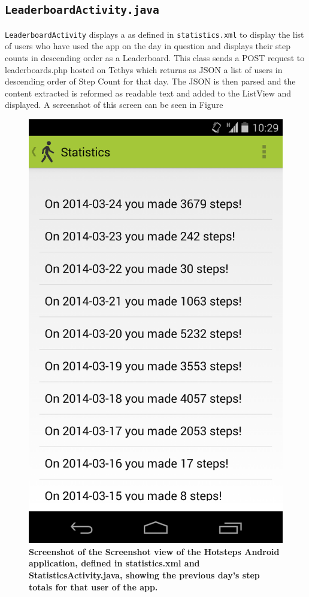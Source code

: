 \documentclass{l4proj}
\begin{document}
\subsection{\texttt{LeaderboardActivity.java}}

\texttt{LeaderboardActivity} displays a \texttt{} as defined in \texttt{statistics.xml} to display the list of users who have used the app on the day in question and displays their step counts in descending order as a Leaderboard. This class sends a POST request to leaderboards.php hosted on Tethys which returns as JSON a list of users in descending order of Step Count for that day. The JSON is then parsed and the content extracted is reformed as readable text and added to the ListView and displayed. A screenshot of this screen can be seen in Figure 

\begin{figure}[H]
\centering
\includegraphics[scale=0.3]{images/screenshots/statisticsscreen.png}
\caption{\textbf{Screenshot of the Screenshot view of the Hotsteps Android application, defined in statistics.xml and StatisticsActivity.java, showing the previous day's step totals for that user of the app.}}
\label{impl:dia23}
\end{figure}
\end{document}
